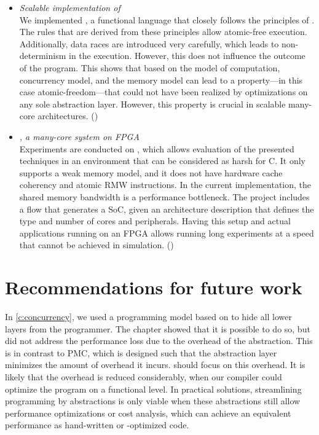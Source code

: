 \begin{itemize}
	\Ac{PMC} defines a memory model that is as weak as possible to allow maximum performance of the implementation, but strong enough to be able to simulate \acl{SC} for data-race free applications.
	Moreover, the annotations of \ac{PMC} allow a transparent implementation for common memory architectures, including software cache coherency and \aclp{SPM}.
	Therefore, \ac{PMC} is the result of \codesign of many-core hardware and the (threaded) concurrency model.
	()
\item \emph{Scalable  implementation of \lcalc}\\
	We implemented \ourfp*, a functional language that closely follows the principles of \lcalc.
	The rules that are derived from these principles allow atomic-free execution.
	Additionally, data races are introduced very carefully, which leads to non-determinism in the execution.
	However, this does not influence the outcome of the program.
	This shows that \keyinsight{\codesign} based on the model of computation, concurrency model, and the memory model can lead to a property---in this case atomic-freedom---that could not have been realized by optimizations on any sole abstraction layer.
	However, this property is crucial in scalable many-core architectures.
	()
\item \emph{\Starburst*, a many-core \MicroBlaze system on \ac{FPGA}}\\
	Experiments are conducted on \Starburst, which allows evaluation of the presented techniques in an environment that can be considered as harsh for C.
	It only supports a weak memory model, and it does not have hardware cache coherency and atomic \acl{RMW} instructions.
	In the current implementation, the shared memory bandwidth is a performance bottleneck.
	The project includes a flow that generates a \ac{SoC}, given an architecture description that defines the type and number of cores and peripherals.
	Having this setup and actual applications running on an \ac{FPGA} allows running long experiments at a speed that cannot be achieved in simulation.
	()
\end{itemize}


\section{Recommendations for future work}

In \cref{c:concurrency}, we used a programming model based on \lcalc to hide all lower layers from the programmer.
The chapter showed that it is possible to do so, but did not address the performance loss due to the overhead of the abstraction.
This is in contrast to \ac{PMC}, which is designed such that the abstraction layer minimizes the amount of overhead it incurs.
 should focus on this overhead.
It is likely that the overhead is reduced considerably, when our compiler could optimize the program on a functional level.
In practical solutions, streamlining programming by abstractions is only viable when these abstractions still allow performance optimizations or cost analysis, which can achieve an equivalent performance as hand-written or -optimized code.

